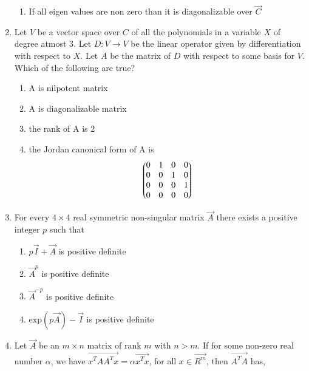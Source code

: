 \begin{enumerate}[label=\thesection.\arabic*.,ref=\thesection.\theenumi]
\begin{enumerate}
\item If all eigen values are non zero than it is diagonalizable over $\vec{C}$
\end{enumerate}
%
\solution

\twocolumn
\item Let $V$ be a vector space over $C$ of all the polynomials in a variable $X$ of degree atmost 3. Let $D:V \xrightarrow{} V$ be the linear operator given by differentiation with respect to $X$. Let $A$ be the matrix of $D$ with respect to some 
basis for $V$. Which of the following are true? \\
\begin{enumerate}
\item A is nilpotent matrix \\
\item A is diagonalizable matrix \\ 
\item the rank of A is 2 \\
\item the Jordan canonical form of A is
\begin{align}\nonumber
    \begin{pmatrix}0&1&0&0\\
       0&0&1&0\\
       0&0&0&1\\
       0&0&0&0\end{pmatrix}
\end{align}
\end{enumerate}
%
\solution

\item For every $4 \times 4$ real symmetric non-singular matrix $\vec{A}$ there 
exists a positive integer $p$ such that

    \begin{enumerate}
        \item $p\vec{I}+\vec{A}$ is positive definite
        \item $\vec{A}^p$ is positive definite
        \item $\vec{A}^{-p}$ is positive definite
        \item $\text{exp}(p\vec{A})-\vec{I}$ is positive definite
        \end{enumerate}
\solution

\item Let $\vec{A}$ be an $m \times n$ matrix of rank $m$ with $n>m$. If for some non-zero real number $\alpha$, we have $\vec{x^TAA^Tx} = \alpha\vec{x^Tx}$, for all $x \in \vec{R^m}$, then $\vec{A^TA}$ has,
\begin{enumerate}


\end{enumerate}
\end{enumerate}
